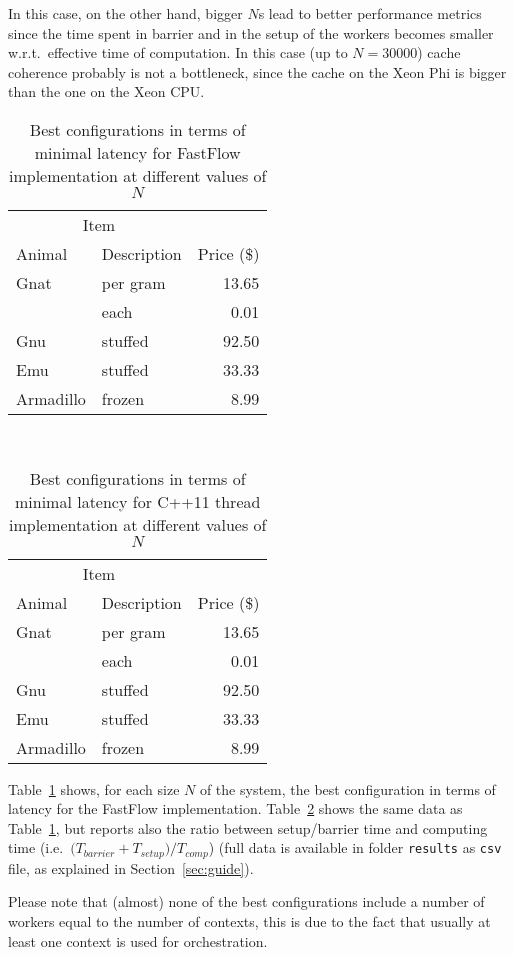 In this case, on the other hand, bigger $N$s lead to better performance metrics since the time spent in barrier and in the setup of the workers becomes smaller w.r.t.\ effective time of computation.
In this case (up to $N = 30000$) cache coherence probably is not a bottleneck, since the cache on the Xeon Phi is bigger than the one on the Xeon CPU.
\begin{table}
	\centering
	\begin{tabular}{llr}  
		\toprule
		\multicolumn{2}{c}{Item} \\
		\cmidrule(r){1-2}
		Animal    & Description & Price (\$) \\
		\midrule
		Gnat      & per gram    & 13.65      \\
		&    each     & 0.01       \\
		Gnu       & stuffed     & 92.50      \\
		Emu       & stuffed     & 33.33      \\
		Armadillo & frozen      & 8.99       \\
		\bottomrule
	\end{tabular}
	\caption{Best configurations in terms of minimal latency for FastFlow implementation at different values of $N$}
	\label{tab:ff}
\end{table}
~
\begin{table}
	\centering
	\begin{tabular}{llr}  
		\toprule
		\multicolumn{2}{c}{Item} \\
		\cmidrule(r){1-2}
		Animal    & Description & Price (\$) \\
		\midrule
		Gnat      & per gram    & 13.65      \\
		&    each     & 0.01       \\
		Gnu       & stuffed     & 92.50      \\
		Emu       & stuffed     & 33.33      \\
		Armadillo & frozen      & 8.99       \\
		\bottomrule
	\end{tabular}
	\caption{Best configurations in terms of minimal latency for C++11 thread implementation at different values of $N$}
	\label{tab:th}
\end{table}
Table~\ref{tab:ff} shows, for each size $N$ of the system, the best configuration in terms of latency for the FastFlow implementation.
Table~\ref{tab:th} shows the same data as Table~\ref{tab:ff}, but reports also the ratio between setup/barrier time and computing time (i.e.\ $({T_{barrier} + T_{setup})/T_{comp}}$) (full data is available in folder \verb|results| as \verb|csv| file, as explained in Section~\ref{sec:guide}).

Please note that (almost) none of the best configurations include a number of workers equal to the number of contexts, this is due to the fact that usually at least one context is used for orchestration.
